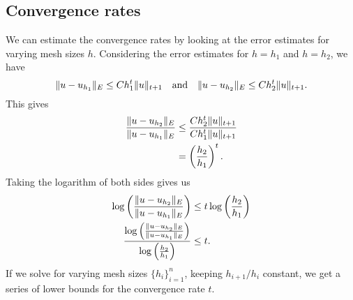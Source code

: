 \subsection{Convergence rates}
We can estimate the convergence rates by looking at the error estimates for varying mesh sizes $h$.
Considering the error estimates for $h = h_1$ and $h = h_2$, we have
\begin{equation*}
    \lVert u - u_{h_1}\rVert_E \leq C h_1^t \lVert u\rVert_{t + 1}
    \quad\text{and}\quad
    \lVert u - u_{h_2}\rVert_E \leq C h_2^t \lVert u\rVert_{t + 1}.
\end{equation*}
This gives
\begin{align*}
    \frac{\lVert u - u_{h_2}\rVert_E}{\lVert u - u_{h_1}\rVert_E}
    &\leq \frac{C h_2^t \lVert u\rVert_{t + 1}}{C h_1^t \lVert u\rVert_{t + 1}} \\
    &= \left(\frac{h_2}{h_1}\right)^t.
\end{align*}
Taking the logarithm of both sides gives us
\begin{align*}
    \log \left(\frac{\lVert u - u_{h_2}\rVert_E}{\lVert u - u_{h_1}\rVert_E}\right)
    &\leq t \log \left(\frac{h_2}{h_1}\right) \\
    \frac{
        \log \left(\frac{\lVert u - u_{h_2}\rVert_E}{\lVert u - u_{h_1}\rVert_E}\right)
    }{
        \log \left(\frac{h_2}{h_1}\right)
    }
    &\leq t.
\end{align*}
If we solve for varying mesh sizes $\{h_i\}_{i=1}^n$, keeping $h_{i+1} / h_i$ constant, we get a series of lower bounds for the convergence rate $t$.